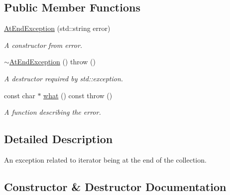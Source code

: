 \subsection*{Public Member Functions}
\begin{DoxyCompactItemize}
\item 
\hyperlink{class_r_c_f_1_1_common_1_1_at_end_exception_a25e3c7bebad9685dd1ed7f186a0ee5fb}{At\+End\+Exception} (std\+::string error)
\begin{DoxyCompactList}\small\item\em A constructor from error. \end{DoxyCompactList}\item 
\hypertarget{class_r_c_f_1_1_common_1_1_at_end_exception_a6fe2fb26f7d5371d9966b1cdde8162b0}{}\hyperlink{class_r_c_f_1_1_common_1_1_at_end_exception_a6fe2fb26f7d5371d9966b1cdde8162b0}{$\sim$\+At\+End\+Exception} ()  throw ()\label{class_r_c_f_1_1_common_1_1_at_end_exception_a6fe2fb26f7d5371d9966b1cdde8162b0}

\begin{DoxyCompactList}\small\item\em A destructor required by std\+::exception. \end{DoxyCompactList}\item 
const char $\ast$ \hyperlink{class_r_c_f_1_1_common_1_1_at_end_exception_ad7360ef3646bb6bc9bfb18d3f044fd9a}{what} () const   throw ()
\begin{DoxyCompactList}\small\item\em A function describing the error. \end{DoxyCompactList}\end{DoxyCompactItemize}


\subsection{Detailed Description}
An exception related to iterator being at the end of the collection. 

\subsection{Constructor \& Destructor Documentation}
\hypertarget{class_r_c_f_1_1_common_1_1_at_end_exception_a25e3c7bebad9685dd1ed7f186a0ee5fb}{}

